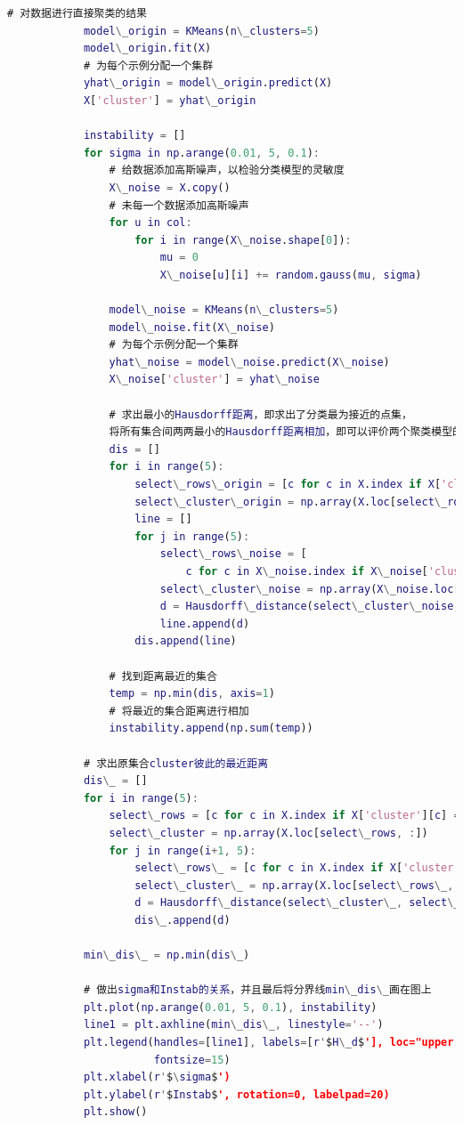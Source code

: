 \documentclass[withoutpreface,bwprint]{cumcmthesis}
\begin{document}
\begin{appendices}
\begin{lstlisting}[language=MATLAB]
			# 对数据进行直接聚类的结果
			model\_origin = KMeans(n\_clusters=5)
			model\_origin.fit(X)
			# 为每个示例分配一个集群
			yhat\_origin = model\_origin.predict(X)
			X['cluster'] = yhat\_origin
			
			instability = []
			for sigma in np.arange(0.01, 5, 0.1):
				# 给数据添加高斯噪声，以检验分类模型的灵敏度
				X\_noise = X.copy()
				# 未每一个数据添加高斯噪声
				for u in col:
					for i in range(X\_noise.shape[0]):
						mu = 0
						X\_noise[u][i] += random.gauss(mu, sigma)
			
				model\_noise = KMeans(n\_clusters=5)
				model\_noise.fit(X\_noise)
				# 为每个示例分配一个集群
				yhat\_noise = model\_noise.predict(X\_noise)
				X\_noise['cluster'] = yhat\_noise
			
				# 求出最小的Hausdorff距离，即求出了分类最为接近的点集，
				将所有集合间两两最小的Hausdorff距离相加，即可以评价两个聚类模型的相似性
				dis = []
				for i in range(5):
					select\_rows\_origin = [c for c in X.index if X['cluster'][c] == i]
					select\_cluster\_origin = np.array(X.loc[select\_rows\_origin, :])
					line = []
					for j in range(5):
						select\_rows\_noise = [
							c for c in X\_noise.index if X\_noise['cluster'][c] == j]
						select\_cluster\_noise = np.array(X\_noise.loc[select\_rows\_noise, :])
						d = Hausdorff\_distance(select\_cluster\_noise, select\_cluster\_origin)
						line.append(d)
					dis.append(line)
			
				# 找到距离最近的集合
				temp = np.min(dis, axis=1)
				# 将最近的集合距离进行相加
				instability.append(np.sum(temp))
			
			# 求出原集合cluster彼此的最近距离
			dis\_ = []
			for i in range(5):
				select\_rows = [c for c in X.index if X['cluster'][c] == i]
				select\_cluster = np.array(X.loc[select\_rows, :])
				for j in range(i+1, 5):
					select\_rows\_ = [c for c in X.index if X['cluster'][c] == j]
					select\_cluster\_ = np.array(X.loc[select\_rows\_, :])
					d = Hausdorff\_distance(select\_cluster\_, select\_cluster)
					dis\_.append(d)
			
			min\_dis\_ = np.min(dis\_)
			
			# 做出sigma和Instab的关系，并且最后将分界线min\_dis\_画在图上
			plt.plot(np.arange(0.01, 5, 0.1), instability)
			line1 = plt.axhline(min\_dis\_, linestyle='--')
			plt.legend(handles=[line1], labels=[r'$H\_d$'], loc="upper left",
					   fontsize=15)
			plt.xlabel(r'$\sigma$')
			plt.ylabel(r'$Instab$', rotation=0, labelpad=20)
			plt.show()
			

\end{lstlisting}
\end{appendices}
\end{document}
